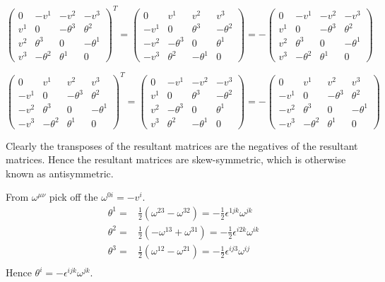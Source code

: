 \documentclass{article}
\begin{document}
\[\begin{pmatrix}0&-v^1&-v^2&-v^3\\v^1&0&-\theta^3&\theta^2\\v^2&\theta^3&0&-\theta^1\\v^3&-\theta^2&\theta^1&0\end{pmatrix}^T=\begin{pmatrix}0&v^1&v^2&v^3\\-v^1&0&\theta^3&-\theta^2\\-v^2&-\theta^3&0&\theta^1\\-v^3&\theta^2&-\theta^1&0\end{pmatrix}=-\begin{pmatrix}0&-v^1&-v^2&-v^3\\v^1&0&-\theta^3&\theta^2\\v^2&\theta^3&0&-\theta^1\\v^3&-\theta^2&\theta^1&0\end{pmatrix}\]

\[\begin{pmatrix}0&v^1&v^2&v^3\\-v^1&0&-\theta^3&\theta^2\\-v^2&\theta^3&0&-\theta^1\\-v^3&-\theta^2&\theta^1&0\end{pmatrix}^T=\begin{pmatrix}0&-v^1&-v^2&-v^3\\v^1&0&\theta^3&-\theta^2\\v^2&-\theta^3&0&\theta^1\\v^3&\theta^2&-\theta^1&0\end{pmatrix}=-\begin{pmatrix}0&v^1&v^2&v^3\\-v^1&0&-\theta^3&\theta^2\\-v^2&\theta^3&0&-\theta^1\\-v^3&-\theta^2&\theta^1&0\end{pmatrix}\]

Clearly the transposes of the resultant matrices are the negatives of the resultant matrices. Hence the resultant matrices are skew-symmetric, which is otherwise known as antisymmetric.

From $\omega^{\mu\nu}$ pick off the $\omega^{0i}=-v^i$.
\begin{align*}
	\theta^1= & \frac{1}{2}(\omega^{23}-\omega^{32})=-\frac{1}{2}\epsilon^{1jk}\omega^{jk}  \\
	\theta^2= & \frac{1}{2}(-\omega^{13}+\omega^{31})=-\frac{1}{2}\epsilon^{i2k}\omega^{ik} \\
	\theta^3= & \frac{1}{2}(\omega^{12}-\omega^{21})=-\frac{1}{2}\epsilon^{ij3}\omega^{ij}  \\
\end{align*}
Hence $\theta^i=-\epsilon^{ijk}\omega^{jk}$.
\end{document}
